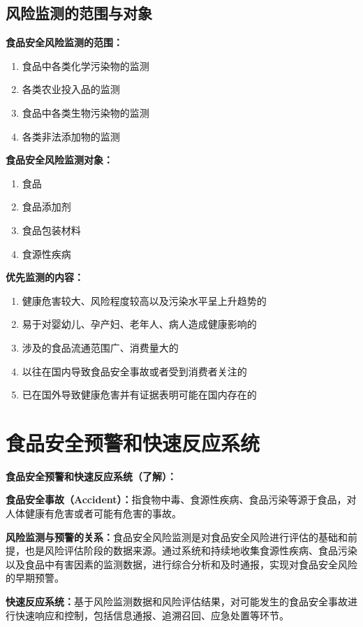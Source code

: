 \subsection{风险监测的范围与对象}

\begin{defbox}
\textbf{食品安全风险监测的范围：}
\begin{enumerate}[leftmargin=*]
    \item 食品中各类化学污染物的监测
    \item 各类农业投入品的监测
    \item 食品中各类生物污染物的监测
    \item 各类非法添加物的监测
\end{enumerate}

\textbf{食品安全风险监测对象：}
\begin{enumerate}[leftmargin=*]
    \item 食品
    \item 食品添加剂
    \item 食品包装材料
    \item 食源性疾病
\end{enumerate}

\textbf{优先监测的内容：}
\begin{enumerate}[leftmargin=*]
    \item 健康危害较大、风险程度较高以及污染水平呈上升趋势的
    \item 易于对婴幼儿、孕产妇、老年人、病人造成健康影响的
    \item 涉及的食品流通范围广、消费量大的
    \item 以往在国内导致食品安全事故或者受到消费者关注的
    \item 已在国外导致健康危害并有证据表明可能在国内存在的
\end{enumerate}
\end{defbox}

\section{食品安全预警和快速反应系统}

\difficulty

\begin{defbox}
\textbf{食品安全预警和快速反应系统（了解）：}

\textbf{食品安全事故（Accident）：}指食物中毒、食源性疾病、食品污染等源于食品，对人体健康有危害或者可能有危害的事故。

\textbf{风险监测与预警的关系：}食品安全风险监测是对食品安全风险进行评估的基础和前提，也是风险评估阶段的数据来源。通过系统和持续地收集食源性疾病、食品污染以及食品中有害因素的监测数据，进行综合分析和及时通报，实现对食品安全风险的早期预警。

\textbf{快速反应系统：}基于风险监测数据和风险评估结果，对可能发生的食品安全事故进行快速响应和控制，包括信息通报、追溯召回、应急处置等环节。
\end{defbox}

